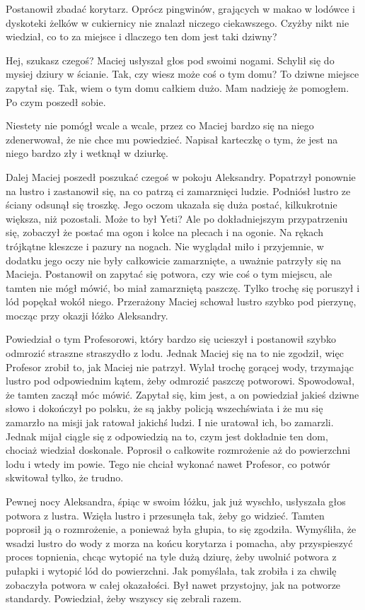 Postanowił zbadać korytarz.
Oprócz pingwinów, grających w makao w lodówce i dyskoteki żelków w cukiernicy nie znalazł niczego ciekawszego. Czyżby nikt nie wiedział, co to za miejsce i dlaczego ten dom jest taki dziwny?
\begin{dialogue}
	\ds{} Hej, szukasz czegoś? \dm{} Maciej usłyszał głos pod swoimi nogami. Schylił się do mysiej dziury w ścianie.
	\ds{} Tak, czy wiesz może coś o tym domu? To dziwne miejsce \dm{} zapytał się.
	\ds{} Tak, wiem o tym domu całkiem dużo. Mam nadzieję że pomogłem. \dm{} Po czym poszedł sobie.
\end{dialogue}
Niestety nie pomógł wcale a wcale, przez co Maciej bardzo się na niego zdenerwował, że nie chce mu powiedzieć. Napisał karteczkę o tym, że jest na niego bardzo zły i wetknął w dziurkę.

Dalej Maciej poszedł poszukać czegoś w pokoju Aleksandry. 
Popatrzył ponownie na lustro i zastanowił się, na co patrzą ci zamarznięci ludzie.
Podniósł lustro ze ściany odsunął się troszkę.
Jego oczom ukazała się duża postać, kilkukrotnie większa, niż pozostali.
Może to był Yeti?
Ale po dokładniejszym przypatrzeniu się, zobaczył że postać ma ogon i kolce na plecach i na ogonie.
Na rękach trójkątne kleszcze i pazury na nogach.
Nie wyglądał miło i przyjemnie, w dodatku jego oczy nie były całkowicie zamarznięte, a uważnie patrzyły się na Macieja.
Postanowił on zapytać się potwora, czy wie coś o tym miejscu, ale tamten nie mógł mówić, bo miał zamarzniętą paszczę. Tylko trochę się poruszył i lód popękał wokół niego.
Przerażony Maciej schował lustro szybko pod pierzynę, mocząc przy okazji łóżko Aleksandry.

Powiedział o tym Profesorowi, który bardzo się ucieszył i postanowił szybko odmrozić straszne straszydło z lodu. Jednak Maciej się na to nie zgodził, więc Profesor zrobił to, jak Maciej nie patrzył.
Wylał trochę gorącej wody, trzymając lustro pod odpowiednim kątem, żeby odmrozić paszczę potworowi.
Spowodował, że tamten zaczął móc mówić. 
Zapytał się, kim jest, a on powiedział jakieś dziwne słowo i dokończył po polsku, że są jakby policją wszechświata i że mu się zamarzło na misji jak ratował jakichś ludzi. I nie uratował ich, bo zamarzli.
Jednak mijał ciągle się z odpowiedzią na to, czym jest dokładnie ten dom, chociaż wiedział doskonale.
Poprosił o całkowite rozmrożenie aż do powierzchni lodu i wtedy im powie.
Tego nie chciał wykonać nawet Profesor, co potwór skwitował tylko, że trudno.

Pewnej nocy Aleksandra, śpiąc w swoim łóżku, jak już wyschło, usłyszała głos potwora z lustra.
Wzięła lustro i przesunęła tak, żeby go widzieć. Tamten poprosił ją o rozmrożenie, a ponieważ była głupia, to się zgodziła. Wymyśliła, że wsadzi lustro do wody z morza na końcu korytarza i pomacha, aby przyspieszyć proces topnienia, chcąc wytopić na tyle dużą dziurę, żeby uwolnić potwora z pułapki i wytopić lód do powierzchni. Jak pomyślała, tak zrobiła i za chwilę zobaczyła potwora w całej okazałości. Był nawet przystojny, jak na potworze standardy. Powiedział, żeby wszyscy się zebrali razem. 

